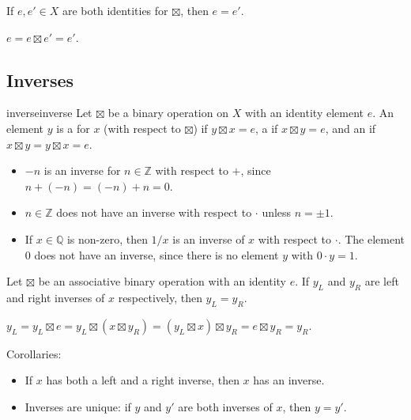 \documentclass[12pt,letterpaper]{report}
\begin{document}
\begin{lem}{}{}
  If $e, e' \in X$ are both identities for $\boxtimes$, then $e = e'$.
\end{lem}

\begin{thmproof}
  $e = e \boxtimes e' = e'$.
\end{thmproof}

\pagebreak
\subsection{Inverses}

\begin{defn}{inverse}{inverse}
  Let $\boxtimes$ be a binary operation on $X$ with an identity element $e$.
  An element $y$ is a  for $x$ (with respect to $\boxtimes$) if
  $y \boxtimes x = e$, a  if $x \boxtimes y = e$, and an  if
  $x \boxtimes y = y \boxtimes x = e$.
\end{defn}

\begin{ex}
  \begin{itemize}
    \item
    $-n$ is an inverse for $n \in \mathbb{Z}$ with respect to $+$, since $n + (-n) = (-n) + n = 0$.
    \item
    $n \in \mathbb{Z}$ does not have an inverse with respect to $\cdot$ unless $n = \pm 1$.
    \item
    If $x \in \mathbb{Q}$ is non-zero, then $1/x$ is an inverse of $x$ with respect to $\cdot$.
    The element $0$ does not have an inverse, since there is no element $y$ with $0 \cdot y = 1$.
  \end{itemize}
\end{ex}

\begin{lem}{}{}
  Let $\boxtimes$ be an associative binary operation with an identity $e$.
  If $y_L$ and $y_R$ are left and right inverses of $x$ respectively, then $y_L = y_R$.
\end{lem}

\begin{thmproof}
  $y_L = y_L \boxtimes e = y_L \boxtimes (x \boxtimes y_R) = (y_L \boxtimes x) \boxtimes y_R =
    e \boxtimes y_R = y_R$.
\end{thmproof}

Corollaries:
\begin{itemize}
  \item If $x$ has both a left and a right inverse, then $x$ has an inverse.
  \item Inverses are unique: if $y$ and $y'$ are both inverses of $x$, then $y = y'$.
\end{itemize}
\end{document}

